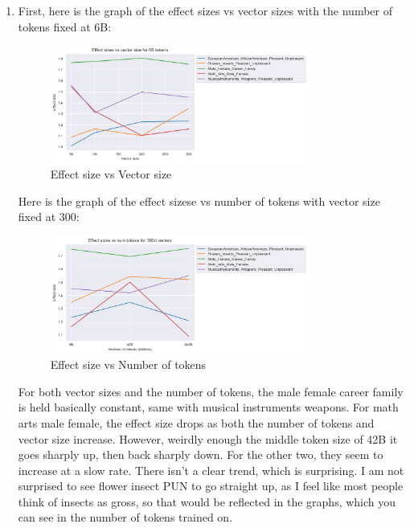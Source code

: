 \documentclass[12pt]{article}
\theoremstyle{definitionstyle}
\begin{document}
\begin{enumerate}
        \item First, here is the graph of the effect sizes vs vector sizes with the number of tokens fixed at 6B:
        \begin{figure}[H]
            \centering
            \includegraphics[width=0.8\textwidth]{images/effect_sizes_6b_tokens.png}
            \caption{Effect size vs Vector size}
        \end{figure}
        Here is the graph of the effect sizese vs number of tokens with vector size fixed at 300:
        \begin{figure}[H]
            \centering
            \includegraphics[width=0.8\textwidth]{images/effect_sizes_300d_vectors.png}
            \caption{Effect size vs Number of tokens}
        \end{figure}
        For both vector sizes and the number of tokens, the male female career family is held basically constant, same with musical instruments weapons. For math arts male female, the effect size drops as both the number of tokens and vector size increase. However, weirdly enough the middle token size of 42B it goes sharply up, then back sharply down. For the other two, they seem to increase at a slow rate. There isn't a clear trend, which is surprising. I am not surprised to see flower insect PUN to go straight up, as I feel like most people think of insects as gross, so that would be reflected in the graphs, which you can see in the number of tokens trained on.
    \end{enumerate}

    \newpage
\end{document}
